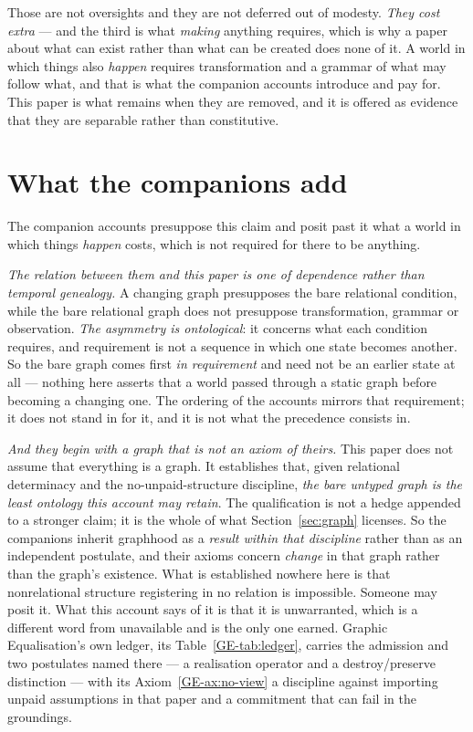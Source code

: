 \documentclass[11pt,a4paper]{article}
\theoremstyle{remark}\newtheorem{remark}[proposition]{Remark}
\begin{document}
Those are not oversights and they are not deferred out of modesty. \emph{They cost extra} --- and the third is what \emph{making} anything requires, which is why a paper
about what can exist rather than what can be created does none of it. A world
in which things also \emph{happen} requires transformation and a grammar of what may follow what, and
that is what the companion accounts introduce and pay for. This paper is what remains when they are
removed, and it is offered as evidence that they are separable rather than constitutive.

\section{What the companions add}\label{sec:companions}
The companion accounts presuppose this claim and posit past it what a world in which things
\emph{happen} costs, which is not required for there to be anything.

\emph{The relation between them and this paper is one of dependence rather than temporal genealogy.}
A changing graph presupposes the bare relational condition, while the bare relational graph does not
presuppose transformation, grammar or observation. \emph{The asymmetry is ontological}: it concerns
what each condition requires, and requirement is not a sequence in which one state becomes another. So
the bare graph comes first \emph{in requirement} and need not be an earlier state at all --- nothing
here asserts that a world passed through a static graph before becoming a changing one. The ordering of
the accounts mirrors that requirement; it does not stand in for it, and it is not what the precedence
consists in.

\emph{And they begin with a graph that is not an axiom of theirs.} This paper does not assume that
everything is a graph. It establishes that, given relational determinacy and the
no-unpaid-structure discipline, \emph{the bare untyped graph is the least ontology this account may
retain}. The qualification is not a hedge appended to a stronger claim; it is the whole of what
Section~\ref{sec:graph} licenses. So the companions inherit graphhood as a \emph{result within that
discipline} rather than as an independent postulate, and their axioms concern \emph{change} in that
graph rather than the graph's existence. What is established nowhere here is that nonrelational
structure registering in no relation is impossible. Someone may posit it. What this account says of it
is that it is unwarranted, which is a different word from unavailable and is the only one earned.
Graphic Equalisation's own ledger, its Table~\ref{GE-tab:ledger}, carries the admission and two
postulates named there --- a realisation operator and a destroy\slash preserve distinction --- with its
Axiom~\ref{GE-ax:no-view} a discipline against
importing unpaid assumptions in that paper and a commitment that can fail in the groundings.
\end{document}
